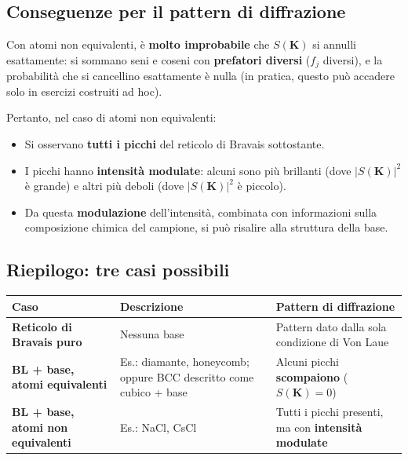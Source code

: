 \subsection*{Conseguenze per il pattern di diffrazione}

Con atomi non equivalenti, è \textbf{molto improbabile} che $S(\mathbf{K})$ si annulli esattamente: si sommano seni e coseni con \textbf{prefatori diversi} ($f_j$ diversi), e la probabilità che si cancellino esattamente è nulla (in pratica, questo può accadere solo in esercizi costruiti ad hoc).

Pertanto, nel caso di atomi non equivalenti:
\begin{itemize}
    \item Si osservano \textbf{tutti i picchi} del reticolo di Bravais sottostante.
    \item I picchi hanno \textbf{intensità modulate}: alcuni sono più brillanti (dove $|S(\mathbf{K})|^2$ è grande) e altri più deboli (dove $|S(\mathbf{K})|^2$ è piccolo).
    \item Da questa \textbf{modulazione} dell'intensità, combinata con informazioni sulla composizione chimica del campione, si può risalire alla struttura della base.
\end{itemize}

\subsection*{Riepilogo: tre casi possibili}

\begin{table}[h!]
\centering
\renewcommand{\arraystretch}{1.3}
\begin{tabularx}{\textwidth}{|l|X|X|}
\hline
\textbf{Caso} & \textbf{Descrizione} & \textbf{Pattern di diffrazione} \\ \hline
\textbf{Reticolo di Bravais puro} & Nessuna base & Pattern dato dalla sola condizione di Von Laue \\ \hline
\textbf{BL + base, atomi equivalenti} & Es.: diamante, honeycomb; oppure BCC descritto come cubico + base & Alcuni picchi \textbf{scompaiono} ($S(\mathbf{K}) = 0$) \\ \hline
\textbf{BL + base, atomi non equivalenti} & Es.: NaCl, CsCl & Tutti i picchi presenti, ma con \textbf{intensità modulate} \\ \hline
\end{tabularx}
\end{table}

